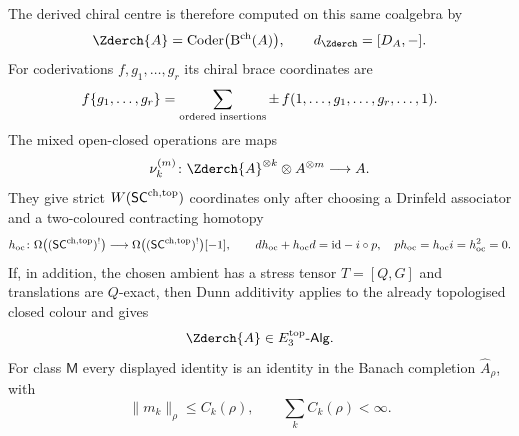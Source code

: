 \begin{theorem}
The derived chiral centre is therefore computed on this same
coalgebra by
\begin{equation}\label{eq:ordered-chiral-bar-derived-centre}
\Zderch{A}
=\operatorname{Coder}\bigl(\mathrm B^{\mathrm{ch}}(A)\bigr),
\qquad
d_{\Zderch}=[D_A,-].
\end{equation}
For coderivations $f,g_1,\ldots,g_r$ its chiral brace coordinates are
\begin{equation}\label{eq:ordered-chiral-bar-brace-coordinate}
f\{g_1,\ldots,g_r\}
=
\sum_{\textup{ordered insertions}}
\pm\, f(1,\ldots,g_1,\ldots,g_r,\ldots,1).
\end{equation}
The mixed open-closed operations are maps
\begin{equation}\label{eq:ordered-chiral-bar-mixed-operations}
\nu_k^{(m)}
\colon
\Zderch{A}^{\otimes k}\otimes A^{\otimes m}\longrightarrow A .
\end{equation}
They give strict $W(\mathsf{SC}^{\mathrm{ch},\mathrm{top}})$ coordinates only after choosing a
Drinfeld associator and a two-coloured contracting homotopy
\begin{equation}\label{eq:ordered-chiral-bar-open-closed-homotopy}
h_{\mathrm{oc}}
\colon
\Omega\bigl((\mathsf{SC}^{\mathrm{ch},\mathrm{top}})^!\bigr)
\longrightarrow
\Omega\bigl((\mathsf{SC}^{\mathrm{ch},\mathrm{top}})^!\bigr)[-1],
\qquad
dh_{\mathrm{oc}}+h_{\mathrm{oc}}d=\mathrm{id}-i\circ p,\quad
p h_{\mathrm{oc}}=h_{\mathrm{oc}}i=h_{\mathrm{oc}}^2=0.
\end{equation}
If, in addition, the chosen ambient has a stress tensor
$T=[Q,G]$ and translations are $Q$-exact, then Dunn additivity applies
to the already topologised closed colour and gives
\[
\Zderch{A}\in E_3^{\mathrm{top}}\text{-}\mathsf{Alg}.
\]
For class $\mathsf M$ every displayed identity is an identity in the
Banach completion $\widehat A_\rho$, with
\[
\|m_k\|_\rho\le C_k(\rho),
\qquad
\sum_k C_k(\rho)<\infty .
\]
\end{theorem}

